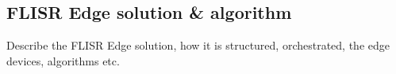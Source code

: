 \subsection{FLISR Edge solution \& algorithm}
\label{sec:flisr_edge}

Describe the FLISR Edge solution, how it is structured, orchestrated, the edge devices, algorithms etc.

